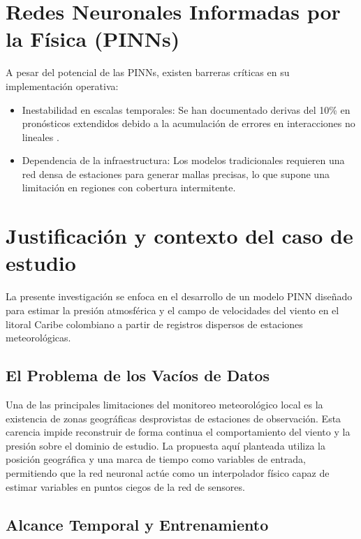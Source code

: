 \section{Redes Neuronales Informadas por la Física (PINNs)}

A pesar del potencial de las PINNs, existen barreras críticas en su implementación operativa:

\begin{itemize}
    \item Inestabilidad en escalas temporales: Se han documentado derivas del 10\% en pronósticos extendidos debido a la acumulación de errores en interacciones no lineales \citep{hennigh2021nvidia}.

    \item Dependencia de la infraestructura: Los modelos tradicionales requieren una red densa de estaciones para generar mallas precisas, lo que supone una limitación en regiones con cobertura intermitente.

\end{itemize}

\section{Justificación y contexto del caso de estudio}

La presente investigación se enfoca en el desarrollo de un modelo PINN diseñado para estimar la presión atmosférica y el campo de velocidades del viento en el litoral Caribe colombiano a partir de registros dispersos de estaciones meteorológicas.

\subsection{El Problema de los Vacíos de Datos}

Una de las principales limitaciones del monitoreo meteorológico local es la existencia de zonas geográficas desprovistas de estaciones de observación. Esta carencia impide reconstruir de forma continua el comportamiento del viento y la presión sobre el dominio de estudio. La propuesta aquí planteada utiliza la posición geográfica y una marca de tiempo como variables de entrada, permitiendo que la red neuronal actúe como un interpolador físico capaz de estimar variables en puntos ciegos de la red de sensores.

\subsection{Alcance Temporal y Entrenamiento}

